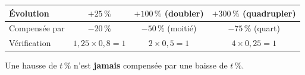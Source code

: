 \documentclass[11pt,a4paper]{article}
\begin{document}
\begin{remarquebox}
\begin{center}
\renewcommand{\arraystretch}{1.4}
\begin{tabular}{|l|c|c|c|}
\hline
Évolution & $+25\,\%$ & $+100\,\%$ (doubler) & $+300\,\%$ (quadrupler)\\
\hline
Compensée par & $-20\,\%$ & $-50\,\%$ (moitié) & $-75\,\%$ (quart)\\
\hline
Vérification & $1{,}25\times 0{,}8=1$ & $2\times 0{,}5=1$ & $4\times 0{,}25=1$\\
\hline
\end{tabular}
\end{center}
Une hausse de $t\,\%$ n'est \textbf{jamais} compensée par une baisse de $t\,\%$.
\end{remarquebox}
\end{document}
